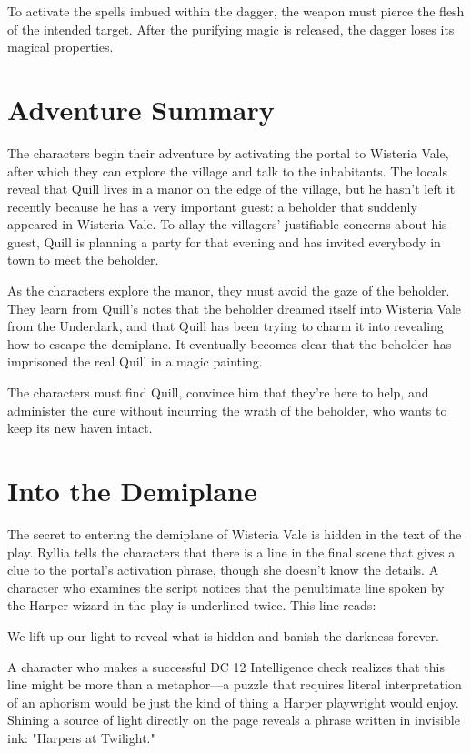 \documentclass[10pt,a4paper,twoside,bg=print,twocolumn,openany,nodeprecatedcode]{dndbook}
\begin{document}
To activate the spells imbued within the dagger, the weapon must pierce the flesh of the intended target. After the purifying magic is released, the dagger loses its magical properties.

\section{Adventure Summary}
The characters begin their adventure by activating the portal to Wisteria Vale, after which they can explore the village and talk to the inhabitants. The locals reveal that Quill lives in a manor on the edge of the village, but he hasn't left it recently because he has a very important guest: a beholder that suddenly appeared in Wisteria Vale. To allay the villagers' justifiable concerns about his guest, Quill is planning a party for that evening and has invited everybody in town to meet the beholder.

As the characters explore the manor, they must avoid the gaze of the beholder. They learn from Quill's notes that the beholder dreamed itself into Wisteria Vale from the Underdark, and that Quill has been trying to charm it into revealing how to escape the demiplane. It eventually becomes clear that the beholder has imprisoned the real Quill in a magic painting.

The characters must find Quill, convince him that they're here to help, and administer the cure without incurring the wrath of the beholder, who wants to keep its new haven intact.

\section{Into the Demiplane}
The secret to entering the demiplane of Wisteria Vale is hidden in the text of the play. Ryllia tells the characters that there is a line in the final scene that gives a clue to the portal's activation phrase, though she doesn't know the details. A character who examines the script notices that the penultimate line spoken by the Harper wizard in the play is underlined twice. This line reads:

\begin{DndReadAloud}{}
We lift up our light to reveal what is hidden and banish the darkness forever.

\end{DndReadAloud}

A character who makes a successful DC 12 Intelligence check realizes that this line might be more than a metaphor—a puzzle that requires literal interpretation of an aphorism would be just the kind of thing a Harper playwright would enjoy. Shining a source of light directly on the page reveals a phrase written in invisible ink: "Harpers at Twilight."
\end{document}
